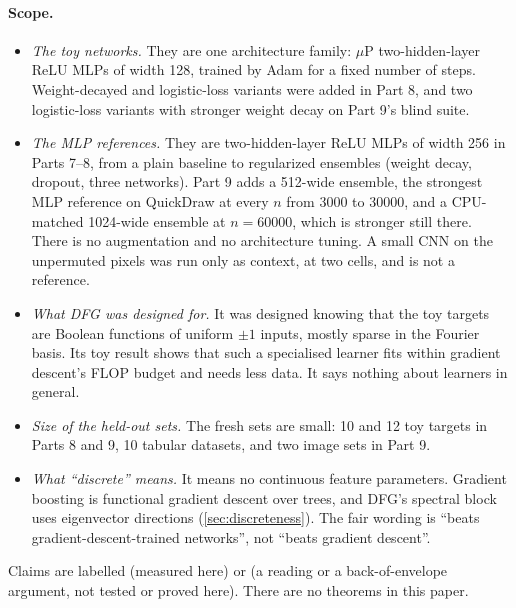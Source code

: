 \paragraph{Scope.}
\begin{itemize}
\item \emph{The toy networks.} They are one architecture family: $\mu$P two-hidden-layer ReLU MLPs of width 128, trained by Adam for a fixed number of steps. Weight-decayed and logistic-loss variants were added in Part 8, and two logistic-loss variants with stronger weight decay on Part 9's blind suite.
\item \emph{The MLP references.} They are two-hidden-layer ReLU MLPs of width 256 in Parts 7--8, from a plain baseline to regularized ensembles (weight decay, dropout, three networks). Part 9 adds a 512-wide ensemble, the strongest MLP reference on QuickDraw at every $n$ from 3000 to 30000, and a CPU-matched 1024-wide ensemble at $n=60000$, which is stronger still there. There is no augmentation and no architecture tuning. A small CNN on the unpermuted pixels was run only as context, at two cells, and is not a reference.
\item \emph{What DFG was designed for.} It was designed knowing that the toy targets are Boolean functions of uniform $\pm1$ inputs, mostly sparse in the Fourier basis. Its toy result shows that such a specialised learner fits within gradient descent's FLOP budget and needs less data. It says nothing about learners in general.
\item \emph{Size of the held-out sets.} The fresh sets are small: 10 and 12 toy targets in Parts 8 and 9, 10 tabular datasets, and two image sets in Part 9.
\item \emph{What ``discrete'' means.} It means no continuous feature parameters. Gradient boosting is functional gradient descent over trees, and DFG's spectral block uses eigenvector directions (\cref{sec:discreteness}). The fair wording is ``beats gradient-descent-trained networks'', not ``beats gradient descent''.
\end{itemize}
Claims are labelled  (measured here) or  (a reading or a back-of-envelope argument, not tested or proved here). There are no theorems in this paper.
